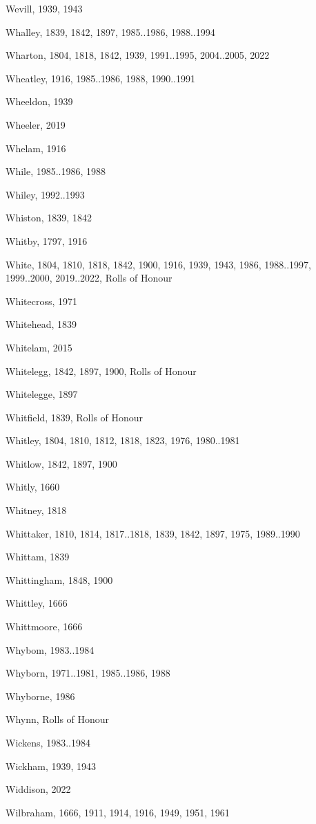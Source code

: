 \begin{theindex}
\item Wevill, 1939, 1943
\item Whalley, 1839, 1842, 1897, 1985..1986, 1988..1994
\item Wharton, 1804, 1818, 1842, 1939, 1991..1995, 2004..2005, 2022
\item Wheatley, 1916, 1985..1986, 1988, 1990..1991
\item Wheeldon, 1939
\item Wheeler, 2019
\item Whelam, 1916
\item While, 1985..1986, 1988
\item Whiley, 1992..1993
\item Whiston, 1839, 1842
\item Whitby, 1797, 1916
\item White, 1804, 1810, 1818, 1842, 1900, 1916, 1939, 1943, 1986, 1988..1997, 1999..2000, 2019..2022, Rolls of Honour
\item Whitecross, 1971
\item Whitehead, 1839
\item Whitelam, 2015
\item Whitelegg, 1842, 1897, 1900, Rolls of Honour
\item Whitelegge, 1897
\item Whitfield, 1839, Rolls of Honour
\item Whitley, 1804, 1810, 1812, 1818, 1823, 1976, 1980..1981
\item Whitlow, 1842, 1897, 1900
\item Whitly, 1660
\item Whitney, 1818
\item Whittaker, 1810, 1814, 1817..1818, 1839, 1842, 1897, 1975, 1989..1990
\item Whittam, 1839
\item Whittingham, 1848, 1900
\item Whittley, 1666
\item Whittmoore, 1666
\item Whybom, 1983..1984
\item Whyborn, 1971..1981, 1985..1986, 1988
\item Whyborne, 1986
\item Whynn, Rolls of Honour
\item Wickens, 1983..1984
\item Wickham, 1939, 1943
\item Widdison, 2022
\item Wilbraham, 1666, 1911, 1914, 1916, 1949, 1951, 1961

\end{theindex}
